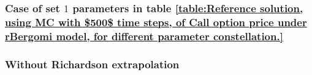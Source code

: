 \subsubsection{Case of set $1$ parameters in table \ref{table:Reference solution, using MC with $500$ time steps, of Call option price under rBergomi model, for different parameter constellation.} }
\label{sec:Case of set $2$ parameters_linear}

\subsubsection*{Without Richardson extrapolation}


